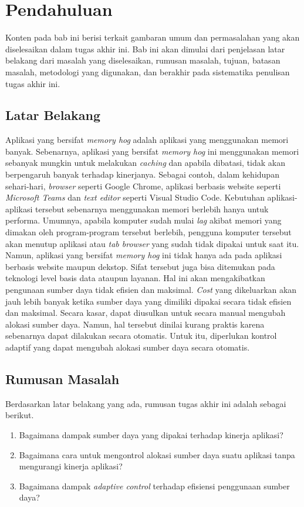 \chapter{Pendahuluan}

Konten pada bab ini berisi terkait gambaran umum dan permasalahan yang akan diselesaikan dalam tugas akhir ini. Bab ini akan dimulai dari penjelasan latar belakang dari masalah yang diselesaikan, rumusan masalah, tujuan, batasan masalah, metodologi yang digunakan, dan berakhir pada sistematika penulisan tugas akhir ini.

\section{Latar Belakang}

Aplikasi yang bersifat \textit{memory hog} adalah aplikasi yang menggunakan memori banyak. Sebenarnya, aplikasi yang bersifat \textit{memory hog} ini menggunakan memori sebanyak mungkin untuk melakukan \textit{caching} dan apabila dibatasi, tidak akan berpengaruh banyak terhadap kinerjanya. Sebagai contoh, dalam kehidupan sehari-hari, \textit{browser} seperti Google Chrome, aplikasi berbasis website seperti \textit{Microsoft Teams} dan \textit{text editor} seperti Visual Studio Code. Kebutuhan aplikasi-aplikasi tersebut sebenarnya menggunakan memori berlebih hanya untuk performa. Umumnya, apabila komputer sudah mulai \textit{lag} akibat memori yang dimakan oleh program-program tersebut berlebih, pengguna komputer tersebut akan menutup aplikasi atau \textit{tab browser} yang sudah tidak dipakai untuk saat itu. Namun, aplikasi yang bersifat \textit{memory hog} ini tidak hanya ada pada aplikasi berbasis website maupun dekstop. Sifat tersebut juga bisa ditemukan pada teknologi level basis data ataupun layanan. Hal ini akan mengakibatkan pengunaan sumber daya tidak efisien dan maksimal. \textit{Cost} yang dikeluarkan akan jauh lebih banyak ketika sumber daya yang dimiliki dipakai secara tidak efisien dan maksimal. Secara kasar, dapat diusulkan untuk secara manual mengubah alokasi sumber daya. Namun, hal tersebut dinilai kurang praktis karena sebenarnya dapat dilakukan secara otomatis. Untuk itu, diperlukan kontrol adaptif yang dapat mengubah alokasi sumber daya secara otomatis.

\section{Rumusan Masalah}

Berdasarkan latar belakang yang ada, rumusan tugas akhir ini adalah sebagai berikut.
\begin{enumerate}
    \item Bagaimana dampak sumber daya yang dipakai terhadap kinerja aplikasi?
    \item Bagaimana cara untuk mengontrol alokasi sumber daya suatu aplikasi tanpa mengurangi kinerja aplikasi?
    \item Bagaimana dampak \textit{adaptive control} terhadap efisiensi penggunaan sumber daya?
\end{enumerate}

